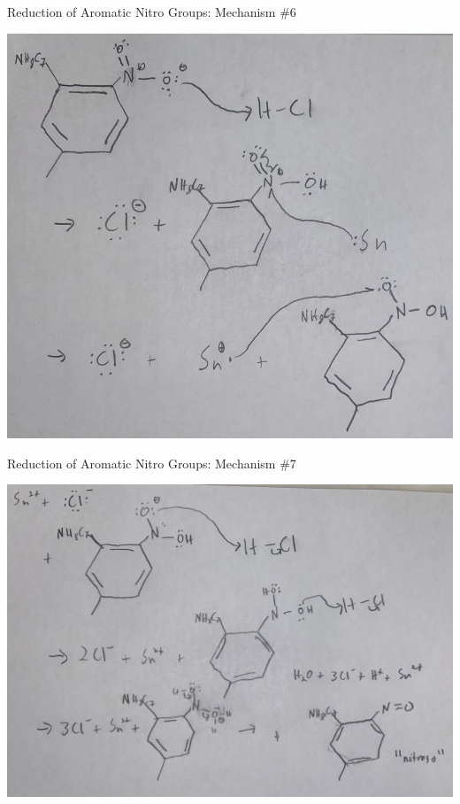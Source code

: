 \documentclass[notes]{beamer}
\begin{document}
\begin{frame}{Reduction of Aromatic Nitro Groups: Mechanism \#6}
    \begin{center}
        \includegraphics[scale=.35]{aromatic_nitro_reduction_six.JPG}
    \end{center}
    
\end{frame}

\begin{frame}{Reduction of Aromatic Nitro Groups: Mechanism \#7}
    \begin{center}
        \includegraphics[scale=.4]{aromatic_nitro_reduction_seven.JPG}
    \end{center}
    
\end{frame}
\end{document}
